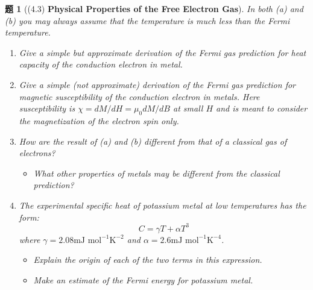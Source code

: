 \documentclass[UTF8,10pt,a4paper]{article}
\theoremstyle{Problem}
\newtheorem{prob}{题}
\theoremstyle{Solution}
\begin{document}
\begin{prob}[(4.3) \textbf{Physical Properties of the Free Electron Gas}]
    In both (a) and (b) you may always assume that the temperature is much less than the Fermi temperature.
    \begin{enumerate}
        \item[(a)$\ddagger$] Give a simple but approximate derivation of the Fermi gas prediction for heat capacity of the conduction electron in metal.
        \item[(b)$\ddagger$] Give a simple (not approximate) derivation of the Fermi gas prediction for magnetic susceptibility of the conduction electron in metals. Here susceptibility is $\chi=dM/dH=\mu_0dM/dB$ at small $H$ and is meant to consider the magnetization of the electron spin only.
        \item[(c)] How are the result of (a) and (b) different from that of a classical gas of electrons?
        \begin{itemize}
            \item[$\triangleright$] What other properties of metals may be different from the classical prediction?
        \end{itemize}
        \item[(d)] The experimental specific heat of potassium metal at low temperatures has the form:
        \begin{equation}
            C=\gamma T+\alpha T^3
        \end{equation}
        where $\gamma=2.08\text{mJ mol}^{-1}\text{K}^{-2}$ and $\alpha=2.6\text{mJ mol}^{-1}\text{K}^{-4}$.
        \begin{itemize}
            \item[$\triangleright$] Explain the origin of each of the two terms in this expression.
            \item[$\triangleright$] Make an estimate of the Fermi energy for potassium metal.
        \end{itemize}
    \end{enumerate}
\end{prob}
\end{document}
